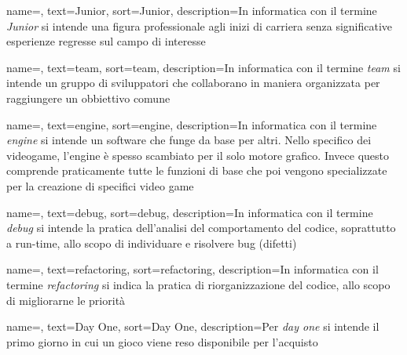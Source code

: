 
\renewcommand{\acronymname}{Acronimi e abbreviazioni}





{
	name=,
	text=Junior,
	sort=Junior,
	description={In informatica con il termine \emph{Junior} si intende una figura professionale agli inizi di carriera senza significative esperienze regresse sul campo di interesse}
}

{
	name=,
	text=team,
	sort=team,
	description={In informatica con il termine \emph{team} si intende un gruppo di sviluppatori che collaborano in maniera organizzata per raggiungere un obbiettivo comune}
}

{
	name=,
	text=engine,
	sort=engine,
	description={In informatica con il termine \emph{engine} si intende un software che funge da base per altri. Nello specifico dei videogame, l'engine è spesso scambiato per il solo motore grafico. Invece questo comprende praticamente tutte le funzioni di base che poi vengono specializzate per la creazione di specifici video game}
}

{
	name=,
	text=debug,
	sort=debug,
	description={In informatica con il termine \emph{debug} si intende la pratica dell'analisi del comportamento del codice, soprattutto a run-time, allo scopo di individuare e risolvere bug (difetti)}
}

{
	name=,
	text=refactoring,
	sort=refactoring,
	description={In informatica con il termine \emph{refactoring} si indica la pratica di riorganizzazione del codice, allo scopo di migliorarne le priorità}
}

{
	name=,
	text=Day One,
	sort=Day One,
	description={Per \emph{day one} si intende il primo giorno in cui un gioco viene reso disponibile per l'acquisto}
}

